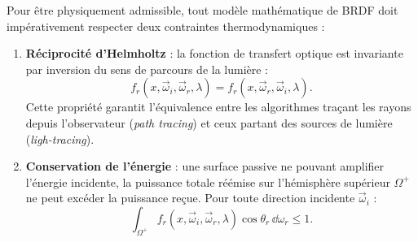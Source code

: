 \begin{prop}[Fondamentales]
    Pour être physiquement admissible, tout modèle mathématique de BRDF doit impérativement respecter deux contraintes thermodynamiques :
    \begin{enumerate}
        \item \textbf{Réciprocité d'Helmholtz} : la fonction de transfert optique est invariante par inversion du sens de parcours de la lumière :
        \begin{equation}
            f_r(x, \vec{\omega}_i, \vec{\omega}_r, \lambda) = f_r(x, \vec{\omega}_r, \vec{\omega}_i, \lambda).
        \end{equation}
        Cette propriété garantit l'équivalence entre les algorithmes traçant les rayons depuis l'observateur (\emph{path tracing}) et ceux partant des sources de lumière (\emph{ligh-tracing}).
        \item \textbf{Conservation de l'énergie} : une surface passive ne pouvant amplifier l'énergie incidente, la puissance totale réémise sur l'hémisphère supérieur $\Omega^+$ ne peut excéder la puissance reçue. Pour toute direction incidente $\vec{\omega}_i$ :
        \begin{equation}
            \int_{\Omega^+} f_r(x, \vec{\omega}_i, \vec{\omega}_r, \lambda) \cos\theta_r \, \dd\omega_r \leqslant 1.
        \end{equation}
    \end{enumerate}
\end{prop}

